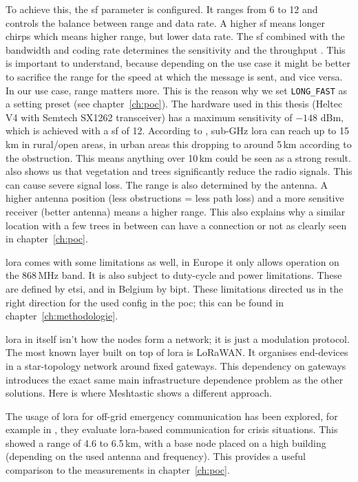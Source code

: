 To achieve this, the \gls{sf} parameter is configured. It ranges from 6 to 12 and controls the balance between range and data rate.
A higher \gls{sf} means longer chirps which means higher range, but lower data rate. The \gls{sf} combined with the bandwidth and coding rate determines the sensitivity and the throughput \autocite{Raza2017LPWAN}.
This is important to understand, because depending on the use case it might be better to sacrifice the range for the speed at which the message is sent, and vice versa. In our use case, range matters more. This is the reason why we set \texttt{LONG\_FAST} as a setting preset (see chapter~\ref{ch:poc}).
The hardware used in this thesis (Heltec V4 with Semtech SX1262 transceiver) has a maximum sensitivity of $-148$ dBm, which is achieved with a \gls{sf} of 12.
According to \textcite{Raza2017LPWAN}, sub-GHz \gls{lora} can reach up to 15\,km in rural/open areas, in urban areas this dropping to around 5\,km according to the obstruction. This means anything over 10\,km could be seen as a strong result.
\textcite{Ma2024ForestAttenuation} also shows us that vegetation and trees significantly reduce the radio signals. This can cause severe signal loss.
The range is also determined by the antenna. A higher antenna position (less obstructions = less path loss) and a more sensitive receiver (better antenna) means a higher range. This also explains why a similar location with a few trees in between can have a connection or not as clearly seen in chapter~\ref{ch:poc}.

\gls{lora} comes with some limitations as well, in Europe it only allows operation on the 868\,MHz band. It is also subject to duty-cycle and power limitations. These are defined by \gls{etsi}, and in Belgium by \gls{bipt}. 
These limitations directed us in the right direction for the used config in the \gls{poc}; this can be found in chapter~\ref{ch:methodologie}.

\gls{lora} in itself isn't how the nodes form a network; it is just a modulation protocol. The most known layer built on top of \gls{lora} is LoRaWAN.
It organises end-devices in a star-topology network around fixed gateways. This dependency on gateways introduces the exact same main infrastructure dependence problem as the other solutions. Here is where Meshtastic shows a different approach.

The usage of \gls{lora} for off-grid emergency communication has been explored, for example in \textcite{Hochst2020LoRa}, they evaluate \gls{lora}-based communication for crisis situations. This showed a range of 4.6 to 6.5\,km, with a base node placed on a high building (depending on the used antenna and frequency).
This provides a useful comparison to the measurements in chapter~\ref{ch:poc}.

